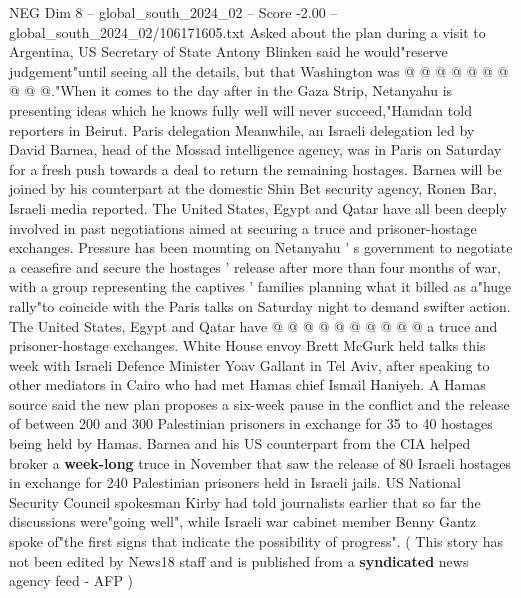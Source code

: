 \begin{textsample}{NEG Dim 8 – global\_south\_2024\_02 – Score -2.00 – global\_south\_2024\_02/106171605.txt}
Asked about the plan during a visit to Argentina, US Secretary of State Antony Blinken said he would"reserve judgement"until seeing all the details, but that Washington was @ @ @ @ @ @ @ @ @ @."When it comes to the day after in the Gaza Strip, Netanyahu is presenting ideas which he knows fully well will never succeed,"Hamdan told reporters in Beirut.
Paris delegation Meanwhile, an Israeli delegation led by David Barnea, head of the Mossad intelligence agency, was in Paris on Saturday for a fresh push towards a deal to return the remaining hostages.
Barnea will be joined by his counterpart at the domestic Shin Bet security agency, Ronen Bar, Israeli media reported.
The United States, Egypt and Qatar have all been deeply involved in past negotiations aimed at securing a truce and prisoner-hostage exchanges.
Pressure has been mounting on Netanyahu ' s government to negotiate a ceasefire and secure the hostages ' release after more than four months of war, with a group representing the captives ' families planning what it billed as a"huge rally"to coincide with the Paris talks on Saturday night to demand swifter action.
The United States, Egypt and Qatar have @ @ @ @ @ @ @ @ @ @ a truce and prisoner-hostage exchanges.
White House envoy Brett McGurk held talks this week with Israeli Defence Minister Yoav Gallant in Tel Aviv, after speaking to other mediators in Cairo who had met Hamas chief Ismail Haniyeh.
A Hamas source said the new plan proposes a six-week pause in the conflict and the release of between 200 and 300 Palestinian prisoners in exchange for 35 to 40 hostages being held by Hamas.
Barnea and his US counterpart from the CIA helped broker a \textbf{week-long} truce in November that saw the release of 80 Israeli hostages in exchange for 240 Palestinian prisoners held in Israeli jails.
US National Security Council spokesman Kirby had told journalists earlier that so far the discussions were"going well", while Israeli war cabinet member Benny Gantz spoke of"the first signs that indicate the possibility of progress". ( This story has not been edited by News18 staff and is published from a \textbf{syndicated} news agency feed - AFP )

\end{textsample}
